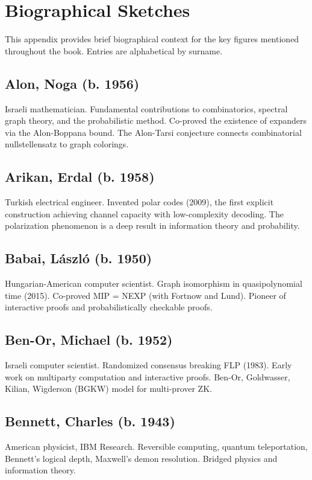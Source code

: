 
\chapter{Biographical Sketches}
\label{app:biographical}

This appendix provides brief biographical context for the key figures mentioned throughout the book. Entries are alphabetical by surname.

\section*{Alon, Noga (b. 1956)}
Israeli mathematician. Fundamental contributions to combinatorics, spectral graph theory, and the probabilistic method. Co-proved the existence of expanders via the Alon-Boppana bound. The Alon-Tarsi conjecture connects combinatorial nullstellensatz to graph colorings.

\section*{Arikan, Erdal (b. 1958)}
Turkish electrical engineer. Invented polar codes (2009), the first explicit construction achieving channel capacity with low-complexity decoding. The polarization phenomenon is a deep result in information theory and probability.

\section*{Babai, László (b. 1950)}
Hungarian-American computer scientist. Graph isomorphism in quasipolynomial time (2015). Co-proved MIP = NEXP (with Fortnow and Lund). Pioneer of interactive proofs and probabilistically checkable proofs.

\section*{Ben-Or, Michael (b. 1952)}
Israeli computer scientist. Randomized consensus breaking FLP (1983). Early work on multiparty computation and interactive proofs. Ben-Or, Goldwasser, Kilian, Wigderson (BGKW) model for multi-prover ZK.

\section*{Bennett, Charles (b. 1943)}
American physicist, IBM Research. Reversible computing, quantum teleportation, Bennett's logical depth, Maxwell's demon resolution. Bridged physics and information theory.

